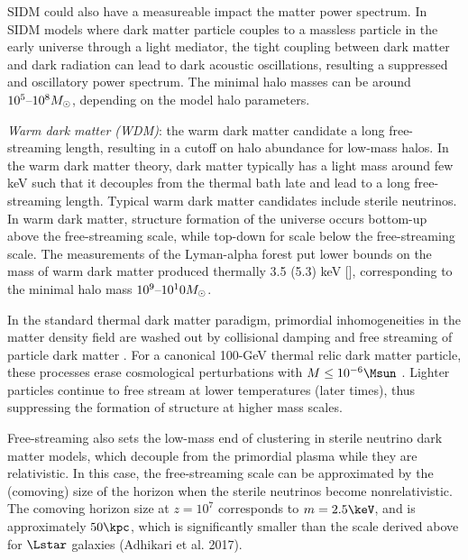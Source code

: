 SIDM could also have a measureable impact the matter power spectrum. In SIDM models where dark matter particle couples to a massless particle in the early universe through a light mediator, the tight coupling between dark matter and dark radiation can lead to dark acoustic oscillations, resulting a suppressed and oscillatory power spectrum. The minimal halo masses can be around $10^5\textup{--}10^8M_\odot$, depending on the model halo parameters.      

{\it Warm dark matter (WDM)}: the warm dark matter candidate a long free-streaming length, resulting in a cutoff on halo abundance for low-mass halos. In the warm dark matter theory, dark matter typically has a light mass around few keV such that it decouples from the thermal bath late and lead to a long free-streaming length. Typical warm dark matter candidates include sterile neutrinos. In warm dark matter, structure formation of the universe occurs bottom-up above the free-streaming scale, while top-down for scale below the free-streaming scale. The measurements of the Lyman-alpha forest put lower bounds on the mass of warm dark matter produced thermally 3.5 (5.3) keV [], corresponding to the minimal halo mass $10^9\textup{--}10^10M_\odot$.

In the standard thermal dark matter paradigm, primordial inhomogeneities in the matter density field are washed out by collisional damping and free streaming of particle dark matter \citep{Hofmann:2001,Green:2003un, Bertschinger:2006nq, Loeb:2005pm}.  For a canonical 100-GeV thermal relic dark matter particle, these processes erase cosmological perturbations with $M \leq 10^{-6} \Msun$ \citep[i.e., Earth mass][]{Green:2003un}. Lighter particles continue to free stream at lower temperatures (later times), thus suppressing the formation of structure at higher mass scales.

Free-streaming also sets the low-mass end of clustering in sterile neutrino dark matter models, which decouple from the primordial plasma while they are relativistic. In this case, the free-streaming scale can be approximated by the (comoving) size of the horizon when the sterile neutrinos become nonrelativistic. The comoving horizon size at $z = 10^7$ corresponds to $m = 2.5 \keV$, and is approximately $50 \kpc$, which is significantly smaller than the scale derived above for $\Lstar$ galaxies (Adhikari et al. 2017). 

